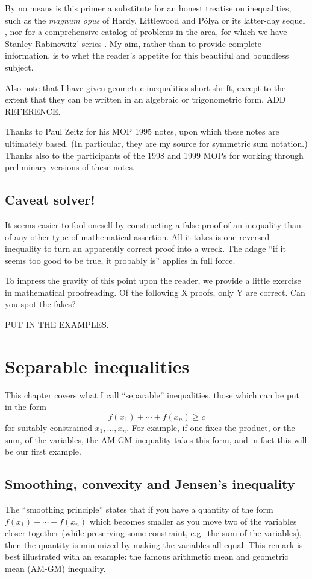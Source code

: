 \documentclass[12pt]{report}
\newcounter{exc}
\numberwithin{exc}{section}
\begin{document}
By no means is this primer a substitute for an honest treatise on 
inequalities, such as the \emph{magnum opus} of Hardy, Littlewood 
and P\'olya \cite{bib:ha} or its latter-day sequel \cite{bib:bmv}, 
nor for a comprehensive catalog of problems in the area, for which we 
have Stanley Rabinowitz' series \cite{bib:rab}.
My 
aim, rather than to provide complete information, is to whet the 
reader's appetite for this beautiful and boundless subject.

Also note that I have given geometric inequalities short shrift, 
except to the extent that they can be written in an algebraic or 
trigonometric form. ADD REFERENCE.

Thanks to Paul Zeitz for his MOP 1995 notes, upon which these notes
are ultimately based. (In particular, they are my source for symmetric
sum notation.) Thanks also to the participants of the 1998 and 1999 MOPs for 
working through preliminary versions of these notes.

\section*{Caveat solver!}

It seems easier to fool oneself by constructing a false proof of an 
inequality than of any other type of mathematical assertion. All it 
takes is one reversed inequality to turn an apparently correct proof 
into a wreck. The adage ``if it seems too good to be true, it probably 
is'' applies in full force.

To impress the gravity of this point upon the reader, we provide a 
little exercise in mathematical proofreading. Of the following X 
proofs, only Y are correct. Can you spot the fakes?

PUT IN THE EXAMPLES.

\chapter{Separable inequalities}
This chapter covers what I call ``separable'' inequalities, those 
which can be put in the form
\[
f(x_{1}) + \cdots + f(x_{n}) \geq c
\]
for suitably constrained $x_{1}, \dots, x_{n}$. For example, if one 
fixes the product, or the sum, of the variables, the AM-GM inequality 
takes this form, and in fact this will be our first example.

\section{Smoothing, convexity and Jensen's inequality}
The ``smoothing principle'' states that if you have a 
quantity of the form $f(x_{1}) + \cdots + f(x_{n})$ which 
becomes smaller as you move two of the variables closer together 
(while preserving some constraint, e.g.\ the sum of the variables), then 
the quantity is minimized by making the variables all equal. This remark is best 
illustrated with an example: the famous arithmetic mean and geometric 
mean (AM-GM) inequality.
\end{document}
